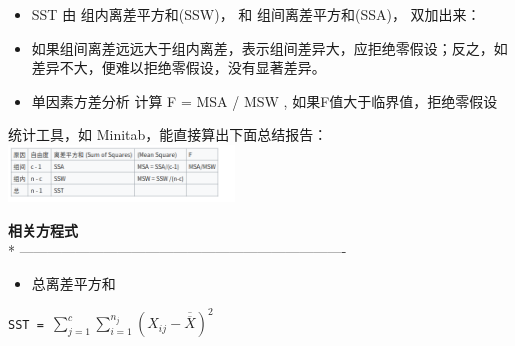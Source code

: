 \begin{description}
\begin{description}
\begin{itemize}
\tightlist
\item
  SST 由 组内离差平方和(SSW)， 和 组间离差平方和(SSA)， 双加出来：
\end{itemize}

\begin{itemize}
\tightlist
\item
  如果组间离差远远大于组内离差，表示组间差异大，应拒绝零假设；反之，如差异不大，便难以拒绝零假设，没有显著差异。
\end{itemize}

\begin{itemize}
\tightlist
\item
  单因素方差分析 计算 F = MSA / MSW , 如果F值大于临界值，拒绝零假设
\end{itemize}

统计工具，如 Minitab，能直接算出下面总结报告：\\


\includegraphics[width=6cm]{Screenshotfrom2023-02-1401-07-07.png}

\textbf{相关方程式}\\
* ----------------------------------------------------------------------\\
\end{description}
\end{description}


\begin{itemize}
\tightlist
\item
  总离差平方和\\
\end{itemize}

\texttt{SST~=~}\(\sum_{j=1}^c \sum_{i=1}^{n_j} (X_{ij} - \overline{\overline{X}})^2\)


\begin{description}
\item[]
\end{description}

